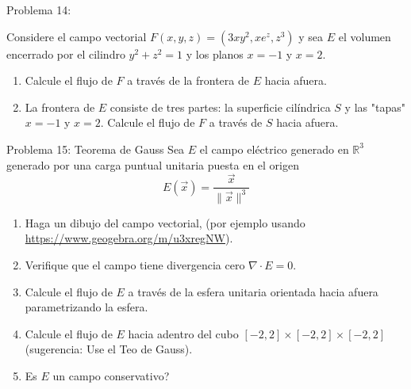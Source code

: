 \documentclass[usepdftitle=false]{beamer}
\begin{document}
\begin{frame}{Problema 14:}

Considere el campo vectorial $F(x,y,z)=(3xy^2, xe^z, z^3)$ y sea $E$ el volumen encerrado por el cilindro $y^2+z^2=1$ 
y los planos $x=-1$ y $x=2$.

\begin{enumerate}
\item Calcule el flujo de $F$ a trav\'es de la frontera de $E$ hacia afuera.

\item La frontera de $E$ consiste de tres partes: la superficie cil\'indrica $S$ y las "tapas" $x=-1$ y $x=2$. Calcule el flujo de $F$ a trav\'es de $S$ hacia afuera.

\end{enumerate}



\end{frame}

\begin{frame}{Problema 15: Teorema de Gauss}
Sea $E$ el campo el\'ectrico generado en $\mathbb{R}^3$ generado por una carga puntual unitaria puesta en el origen 
\[E(\vec{x})=\frac{\vec{x}}{\|\vec{x}\|^3}\]

\begin{enumerate}
\item Haga un dibujo del campo vectorial, 
(por ejemplo usando \url{https://www.geogebra.org/m/u3xregNW}).
\item Verifique que el campo tiene divergencia cero $\nabla\cdot E=0$.
\item Calcule el flujo de $E$ a trav\'es de la esfera unitaria orientada hacia afuera parametrizando la esfera.
\item Calcule el flujo de $E$ hacia adentro del cubo $[-2,2]\times [-2,2]\times [-2,2]$ (sugerencia: Use el Teo de Gauss).
\item Es $E$ un campo conservativo?\end{enumerate}

\end{frame}
\end{document}
